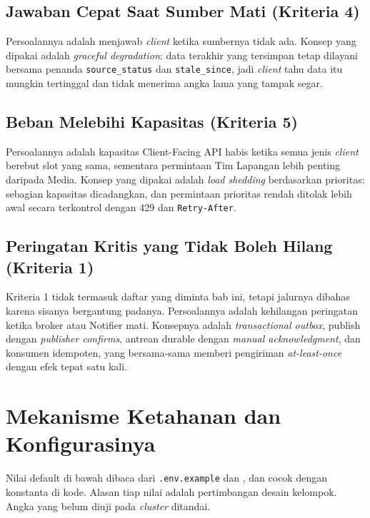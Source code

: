 \subsection{Jawaban Cepat Saat Sumber Mati (Kriteria 4)}

Persoalannya adalah menjawab \textit{client} ketika sumbernya tidak ada. Konsep yang dipakai adalah \textit{graceful degradation}: data terakhir yang tersimpan tetap dilayani bersama penanda \texttt{source\_status} dan \texttt{stale\_since}, jadi \textit{client} tahu data itu mungkin tertinggal dan tidak menerima angka lama yang tampak segar.

\subsection{Beban Melebihi Kapasitas (Kriteria 5)}

Persoalannya adalah kapasitas Client-Facing API habis ketika semua jenis \textit{client} berebut slot yang sama, sementara permintaan Tim Lapangan lebih penting daripada Media. Konsep yang dipakai adalah \textit{load shedding} berdasarkan prioritas: sebagian kapasitas dicadangkan, dan permintaan prioritas rendah ditolak lebih awal secara terkontrol dengan 429 dan \texttt{Retry-After}.

\subsection{Peringatan Kritis yang Tidak Boleh Hilang (Kriteria 1)}

Kriteria 1 tidak termasuk daftar yang diminta bab ini, tetapi jalurnya dibahas karena sisanya bergantung padanya. Persoalannya adalah kehilangan peringatan ketika broker atau Notifier mati. Konsepnya adalah \textit{transactional outbox}, publish dengan \textit{publisher confirms}, antrean durable dengan \textit{manual acknowledgment}, dan konsumen idempoten, yang bersama-sama memberi pengiriman \textit{at-least-once} dengan efek tepat satu kali.

\section{Mekanisme Ketahanan dan Konfigurasinya}

Nilai default di bawah dibaca dari \texttt{.env.example} dan , dan cocok dengan konstanta di kode. Alasan tiap nilai adalah pertimbangan desain kelompok. Angka yang belum diuji pada \textit{cluster} ditandai.

